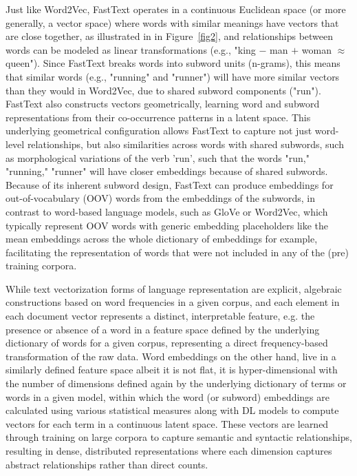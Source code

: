 \documentclass[final]{clv2025-revised}
\begin{document}
Just like Word2Vec, FastText operates in a continuous Euclidean space (or more generally, a vector space) where words with similar meanings have vectors that are close together, as illustrated in in Figure~\ref{fig2}, and relationships between words can be modeled as linear transformations (e.g., "king $-$ man $+$ woman $\approx$ queen"). Since FastText breaks words into subword units (n-grams), this means that similar words (e.g., "running" and "runner") will have more similar vectors than they would in Word2Vec, due to shared subword components ("run"). FastText also constructs vectors geometrically, learning word and subword representations from their co-occurrence patterns in a latent space. This underlying geometrical configuration allows FastText to capture not just word-level relationships, but also similarities across words with shared subwords, such as morphological variations of the verb 'run', such that the words "run," "running," "runner" will have closer embeddings because of shared subwords. Because of its inherent subword design, FastText can produce embeddings for out-of-vocabulary (OOV) words from the embeddings of the subwords, in contrast to word-based language models, such as GloVe or Word2Vec, which typically represent OOV words with generic embedding placeholders like the mean embeddings across the whole dictionary of embeddings for example, facilitating the representation of words that were not included in any of the (pre) training corpora.

While text vectorization forms of language representation are explicit, algebraic constructions based on word frequencies in a given corpus, and each element in each document vector represents a distinct, interpretable feature, e.g. the presence or absence of a word in a feature space defined by the underlying dictionary of words for a given corpus, representing a direct frequency-based transformation of the raw data. Word embeddings on the other hand, live in a similarly defined feature space albeit it is not flat, it is hyper-dimensional with the number of dimensions defined again by the underlying dictionary of terms or words in a given model, within which the word (or subword) embeddings are calculated using various statistical measures along with DL models to compute vectors for each term in a continuous latent space. These vectors are learned through training on large corpora to capture semantic and syntactic relationships, resulting in dense, distributed representations where each dimension captures abstract relationships rather than direct counts. 
\end{document}
